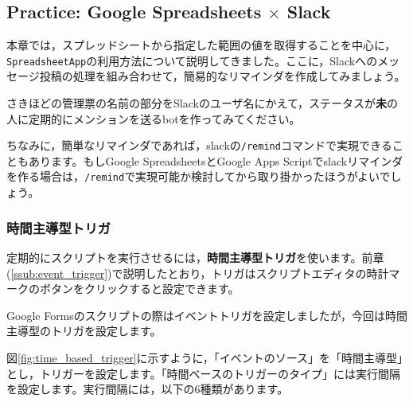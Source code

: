 \documentclass[uplatex,a4j]{jsarticle}
\begin{document}
\subsection{Practice: Google Spreadsheets $\times$ Slack}

本章では，スプレッドシートから指定した範囲の値を取得することを中心に，\verb|SpreadsheetApp|の利用方法について説明してきました。ここに，Slackへのメッセージ投稿の処理を組み合わせて，簡易的なリマインダを作成してみましょう。

さきほどの管理票の名前の部分をSlackのユーザ名にかえて，ステータスが\textbf{未}の人に定期的にメンションを送るbotを作ってみてください。

ちなみに，簡単なリマインダであれば，slackの\verb|/remind|コマンドで実現できることもあります。もしGoogle SpreadsheetsとGoogle Apps Scriptでslackリマインダを作る場合は，\verb|/remind|で実現可能か検討してから取り掛かったほうがよいでしょう。

\subsubsection{時間主導型トリガ}

定期的にスクリプトを実行させるには，\textbf{時間主導型トリガ}を使います。前章(\ref{ssub:event_trigger})で説明したとおり，トリガはスクリプトエディタの時計マークのボタンをクリックすると設定できます。

Google Formsのスクリプトの際はイベントトリガを設定しましたが，今回は時間主導型のトリガを設定します。


図\ref{fig:time_based_trigger}に示すように，「イベントのソース」を「時間主導型」とし，トリガーを設定します。「時間ベースのトリガーのタイプ」には実行間隔を設定します。実行間隔には，以下の6種類があります。
\end{document}

